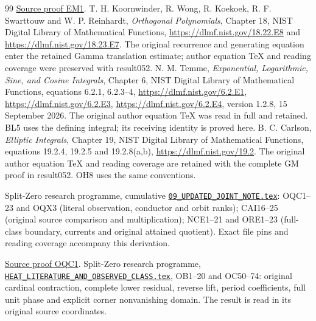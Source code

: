 \documentclass[11pt]{article}
\begin{document}
\begin{thebibliography}{99}
\href{https://github.com/KokunoYumeto/zeta-function-research-reader/blob/5992ad50c0f2a06921f1fcaded7b4e38097c0739/workbenches/splitzero-tandem/continuations/20260920-original-kernel-mixed-determinants/providers/ENDPOINT_METRIC_HEAT.tex\#L38}{Source proof EM1}.
 T. H. Koornwinder, R. Wong, R. Koekoek,
R. F. Swarttouw and W. P. Reinhardt, \emph{Orthogonal Polynomials},
Chapter 18, NIST Digital Library of Mathematical Functions,
\url{https://dlmf.nist.gov/18.22.E8} and
\url{https://dlmf.nist.gov/18.23.E7}. The original recurrence and
generating equation enter the retained Gamma translation estimate;
author equation TeX and reading coverage were preserved with result052.
 N. M. Temme, \emph{Exponential, Logarithmic, Sine, and
Cosine Integrals}, Chapter 6, NIST Digital Library of Mathematical
Functions, equations 6.2.1, 6.2.3--4,
\url{https://dlmf.nist.gov/6.2.E1},
\url{https://dlmf.nist.gov/6.2.E3},
\url{https://dlmf.nist.gov/6.2.E4}, version 1.2.8, 15 September 2026.
The original author equation TeX was read in full and retained. BL5
uses the defining integral; its receiving identity is proved here.
 B. C. Carlson, \emph{Elliptic Integrals}, Chapter 19,
NIST Digital Library of Mathematical Functions, equations 19.2.4,
19.2.5 and 19.2.8(a,b), \url{https://dlmf.nist.gov/19.2}.
The original author equation TeX and reading coverage are retained
with the complete GM proof in result052. OH8 uses the same conventions.


 Split-Zero research programme, cumulative
\href{https://github.com/KokunoYumeto/zeta-function-research-reader/blob/5992ad50c0f2a06921f1fcaded7b4e38097c0739/workbenches/splitzero-tandem/continuations/20260920-original-kernel-mixed-determinants/cumulative/09_UPDATED_JOINT_NOTE.tex\#L1}{\texttt{09\_UPDATED\_JOINT\_NOTE.tex}}: OQC1--23 and OQX3 (literal
observation, conductor and orbit ranks); CAI16--25 (original source
comparison and multiplication); NCE1--21 and ORE1--23 (full-class
boundary, currents and original attained quotient). Exact file pins
and reading coverage accompany this derivation.

\href{https://github.com/KokunoYumeto/zeta-function-research-reader/blob/5992ad50c0f2a06921f1fcaded7b4e38097c0739/workbenches/splitzero-tandem/continuations/20260920-original-kernel-mixed-determinants/cumulative/09_UPDATED_JOINT_NOTE.tex\#L11282}{Source proof OQC1}.
 Split-Zero research programme,
\href{https://github.com/KokunoYumeto/zeta-function-research-reader/blob/487253b5b01851da5b9b98af4e146fecf1fab902/workbenches/splitzero-tandem/continuations/20260920-heat-literature-observed-class/HEAT_LITERATURE_AND_OBSERVED_CLASS.tex\#L1}{\texttt{HEAT\_LITERATURE\_AND\_OBSERVED\_CLASS.tex}}, OB1--20 and
OC50--74: original cardinal contraction, complete lower residual,
reverse lift, period coefficients, full unit phase and explicit corner
nonvanishing domain. The result is read in its original source coordinates.


\end{thebibliography}
\end{document}
